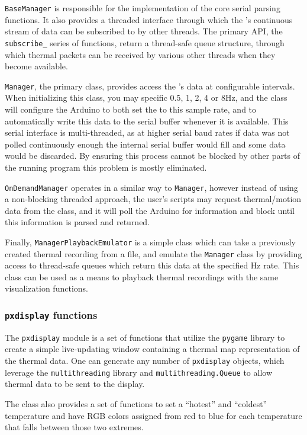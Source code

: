 \documentclass[../thesis/thesis.tex]{subfiles}
\begin{document}
\texttt{BaseManager} is responsible for the implementation of the core serial parsing functions. It also provides a threaded interface through which the \mlx's continuous stream of data can be subscribed to by other threads. The primary API, the \texttt{subscribe\_} series of functions, return a thread-safe queue structure, through which thermal packets can be received by various other threads when they become available.

\texttt{Manager}, the primary class, provides access the \mlx's data at configurable intervals. When initializing this class, you may specific 0.5, 1, 2, 4 or 8Hz, and the class will configure the Arduino to both set the \mlx to this sample rate, and to automatically write this data to the serial buffer whenever it is available. This serial interface is multi-threaded, as at higher serial baud rates if data was not polled continuously enough the internal serial buffer would fill and some data would be discarded. By ensuring this process cannot be blocked by other parts of the running program this problem is mostly eliminated. 

\texttt{OnDemandManager} operates in a similar way to \texttt{Manager}, however instead of using a non-blocking threaded approach, the user's scripts may request thermal/motion data from the class, and it will poll the Arduino for information and block until this information is parsed and returned.

Finally, \texttt{ManagerPlaybackEmulator} is a simple class which can take a previously created thermal recording from a file, and emulate the \texttt{Manager} class by providing access to thread-safe queues which return this data at the specified Hz rate. This class can be used as a means to playback thermal recordings with the same visualization functions.

\subsubsection{\texttt{pxdisplay} functions}

The \texttt{pxdisplay} module is a set of functions that utilize the \texttt{pygame} library to create a simple live-updating window containing a thermal map representation of the thermal data. One can generate any number of \texttt{pxdisplay} objects, which leverage the \texttt{multithreading} library and \texttt{multithreading.Queue} to allow thermal data to be sent to the display.

The class also provides a set of functions to set a ``hotest'' and ``coldest'' temperature and have RGB colors assigned from red to blue for each temperature that falls between those two extremes.
\end{document}
